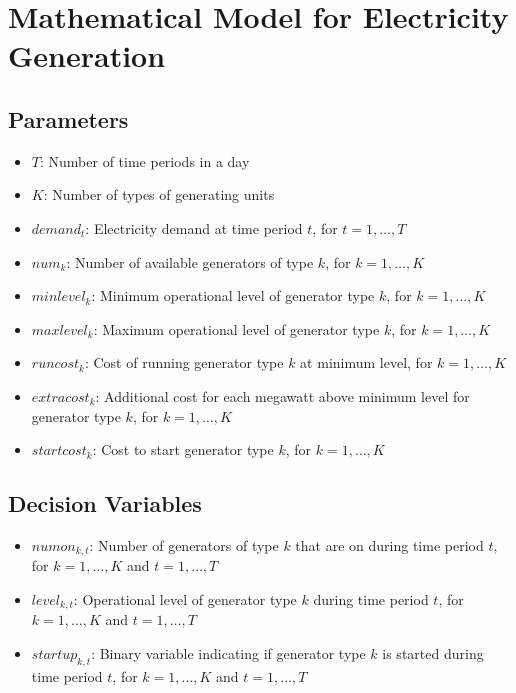 \documentclass{article}
\begin{document}
\section*{Mathematical Model for Electricity Generation}

\subsection*{Parameters}

\begin{itemize}
    \item $T$: Number of time periods in a day
    \item $K$: Number of types of generating units
    \item $demand_{t}$: Electricity demand at time period $t$, for $t = 1,\ldots,T$
    \item $num_{k}$: Number of available generators of type $k$, for $k = 1,\ldots,K$
    \item $minlevel_{k}$: Minimum operational level of generator type $k$, for $k = 1,\ldots,K$
    \item $maxlevel_{k}$: Maximum operational level of generator type $k$, for $k = 1,\ldots,K$
    \item $runcost_{k}$: Cost of running generator type $k$ at minimum level, for $k = 1,\ldots,K$
    \item $extracost_{k}$: Additional cost for each megawatt above minimum level for generator type $k$, for $k = 1,\ldots,K$
    \item $startcost_{k}$: Cost to start generator type $k$, for $k = 1,\ldots,K$
\end{itemize}

\subsection*{Decision Variables}

\begin{itemize}
    \item $numon_{k,t}$: Number of generators of type $k$ that are on during time period $t$, for $k = 1,\ldots,K$ and $t = 1,\ldots,T$
    \item $level_{k,t}$: Operational level of generator type $k$ during time period $t$, for $k = 1,\ldots,K$ and $t = 1,\ldots,T$
    \item $startup_{k,t}$: Binary variable indicating if generator type $k$ is started during time period $t$, for $k = 1,\ldots,K$ and $t = 1,\ldots,T$
\end{itemize}
\end{document}
